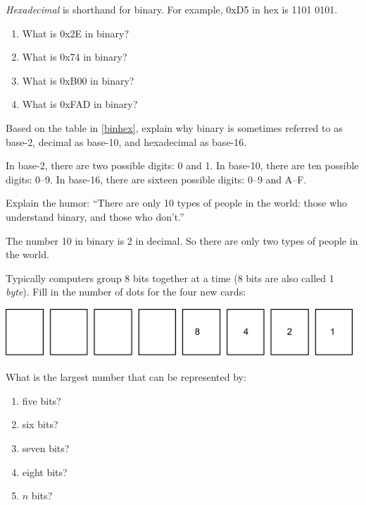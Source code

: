 \Q \emph{Hexadecimal} is shorthand for binary. For example, 0xD5 in hex is 1101 0101.

\begin{enumerate}
\item What is 0x2E in binary? 
\item What is 0x74 in binary? 
\item What is 0xB00 in binary? 
\item What is 0xFAD in binary? 
\end{enumerate}


\Q Based on the table in \ref{binhex}, explain why binary is sometimes referred to as base-2, decimal as base-10, and hexadecimal as base-16.

\begin{answer}
In base-2, there are two possible digits: 0 and 1.
In base-10, there are ten possible digits: 0--9.
In base-16, there are sixteen possible digits: 0--9 and A--F.
\end{answer}


\Q Explain the humor: ``There are only 10 types of people in the world: those who understand binary, and those who don't.''

\begin{answer}
The number 10 in binary is 2 in decimal.
So there are only two types of people in the world.
\end{answer}


\Q Typically computers group 8 bits together at a time (8 bits are also called 1 \emph{byte}).
Fill in the number of dots for the four new cards: 

\begin{center}
\includegraphics[width=\textwidth]{binary5.png}
\end{center}


\Q What is the largest number that can be represented by:
\begin{enumerate}
\item five bits? 
\item six bits? 
\item seven bits? 
\item eight bits? 
\item $n$ bits? 
\end{enumerate}


